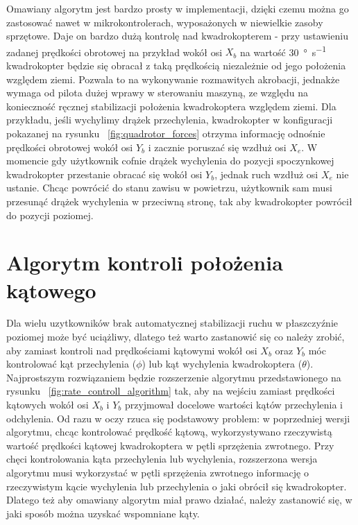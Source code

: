 Omawiany algorytm jest bardzo prosty w implementacji, dzięki czemu można go zastosować nawet w mikrokontrolerach, wyposażonych w niewielkie zasoby sprzętowe. Daje on bardzo dużą kontrolę nad kwadrokopterem - przy ustawieniu zadanej prędkości obrotowej na przykład wokół osi $X_b$ na wartość \SI{30}{\degree\per\second} kwadrokopter będzie się obracał z taką prędkością niezależnie od jego położenia względem ziemi. Pozwala to na wykonywanie rozmawitych akrobacji, jednakże wymaga od pilota dużej wprawy w sterowaniu maszyną, ze względu na konieczność ręcznej stabilizacji położenia kwadrokoptera względem ziemi. Dla przykładu, jeśli wychylimy drążek przechylenia, kwadrokopter w konfiguracji pokazanej na rysunku  ~\ref{fig:quadrotor_forces} otrzyma informację odnośnie prędkości obrotowej wokół osi $Y_b$ i zacznie poruszać się wzdłuż osi $X_e$. W momencie gdy użytkownik cofnie drążek wychylenia do pozycji spoczynkowej kwadrokopter przestanie obracać się  wokół osi $Y_b$, jednak ruch wzdłuż osi $X_e$ nie ustanie. Chcąc powrócić do stanu zawisu w powietrzu, użytkownik sam musi przesunąć drążek wychylenia w przeciwną stronę, tak aby kwadrokopter powrócił do pozycji poziomej. 

\section{Algorytm kontroli położenia kątowego}

Dla wielu uzytkowników brak automatycznej stabilizacji ruchu w płaszczyźnie poziomej może być uciążliwy, dlatego też warto zastanowić się co należy zrobić, aby zamiast kontroli nad prędkościami kątowymi wokół osi $X_b$ oraz $Y_b$ móc kontrolować kąt przechylenia ($\phi$) lub kąt wychylenia kwadrokoptera ($\theta$). Najprostszym rozwiązaniem będzie rozszerzenie algorytmu przedstawionego na rysunku ~\ref{fig:rate_controll_algorithm} tak, aby na wejściu zamiast prędkości kątowych wokół osi $X_b$ i $Y_b$ przyjmował docelowe wartości kątów przechylenia i odchylenia. Od razu w oczy rzuca się podstawowy problem: w poprzedniej wersji algorytmu, chcąc kontrolować prędkość kątową, wykorzystywano rzeczywistą wartość prędkości kątowej kwadrokoptera w pętli sprzężenia zwrotnego. Przy chęci kontrolowania kąta przechylenia lub wychylenia, rozszerzona wersja algorytmu musi wykorzystać w pętli sprzężenia zwrotnego informację o rzeczywistym kącie wychylenia lub przechylenia o jaki obrócił się kwadrokopter. Dlatego też aby omawiany algorytm miał prawo działać, należy zastanowić się, w jaki sposób można uzyskać wspomniane kąty.  

